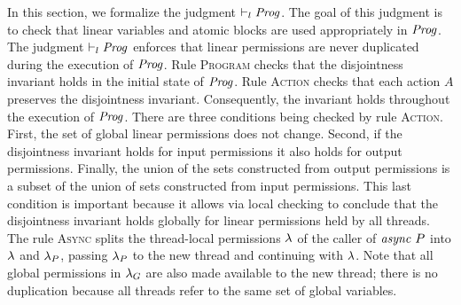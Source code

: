 In this section, we formalize the judgment $\vdash_l \mathit{Prog}$.
The goal of this judgment is to check that
linear variables and atomic blocks are used appropriately in $\mathit{Prog}$.
The judgment $\vdash_l \mathit{Prog}$ enforces that linear permissions are never duplicated during the 
execution of $\mathit{Prog}$.
Rule \textsc{Program} checks that the disjointness invariant holds in the initial state of $\mathit{Prog}$.
Rule \textsc{Action} checks that each action $A$ preserves the disjointness invariant.
Consequently, the invariant holds throughout the execution of $\mathit{Prog}$.
There are three conditions being checked by rule \textsc{Action}.
First, the set of global linear permissions does not change.
Second, if the disjointness invariant holds for input permissions it also holds for output permissions.
Finally, the union of the sets constructed from output permissions is a subset of the union of sets
constructed from input permissions.  
This last condition is important because it allows via local checking to conclude that the disjointness invariant holds globally
for linear permissions held by all threads.
The rule \textsc{Async} splits the thread-local permissions $\lambda$ of the caller of $\mathit{async}\ P$ into $\lambda$ 
and $\lambda_P$, passing $\lambda_P$ to the new thread and continuing with $\lambda$.
Note that all global permissions in $\lambda_G$ are also made available to the new thread;
there is no duplication because all threads refer to the same set of global variables.

